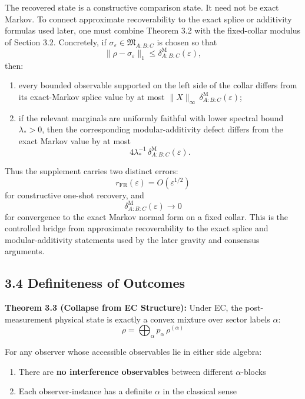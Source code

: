 The recovered state is a constructive comparison state. It need not be exact Markov. To connect approximate recoverability to the exact splice or additivity formulas used later, one must combine Theorem 3.2 with the fixed-collar modulus of Section 3.2. Concretely, if \(\sigma_\varepsilon\in\mathfrak M_{A:B:C}\) is chosen so that
\[
\|\rho-\sigma_\varepsilon\|_1
\le
\delta^{\mathrm M}_{A:B:C}(\varepsilon),
\]
then:
\begin{enumerate}
\item every bounded observable supported on the left side of the collar differs from its exact-Markov splice value by at most \(\|X\|_\infty\,\delta^{\mathrm M}_{A:B:C}(\varepsilon)\);
\item if the relevant marginals are uniformly faithful with lower spectral bound \(\lambda_\ast>0\), then the corresponding modular-additivity defect differs from the exact Markov value by at most
\[
4\lambda_\ast^{-1}\,
\delta^{\mathrm M}_{A:B:C}(\varepsilon).
\]
\end{enumerate}

Thus the supplement carries two distinct errors:
\[
r_{\mathrm{FR}}(\varepsilon)=O(\varepsilon^{1/2})
\]
for constructive one-shot recovery, and
\[
\delta^{\mathrm M}_{A:B:C}(\varepsilon)\to0
\]
for convergence to the exact Markov normal form on a fixed collar. This is the controlled bridge from approximate recoverability to the exact splice and modular-additivity statements used by the later gravity and consensus arguments.

\subsection{3.4 Definiteness of Outcomes}\label{34-definiteness-of-outcomes}

\textbf{Theorem 3.3 (Collapse from EC Structure):} Under EC, the post-measurement physical state is exactly a convex mixture over sector labels \(\alpha\): \[\rho = \bigoplus_\alpha p_\alpha \, \rho^{(\alpha)}\]

For any observer whose accessible observables lie in either side algebra:

\begin{enumerate}
\def\labelenumi{\arabic{enumi}.}
\tightlist
\item
  There are \textbf{no interference observables} between different \(\alpha\)-blocks
\item
  Each observer-instance has a definite \(\alpha\) in the classical sense
\end{enumerate}

